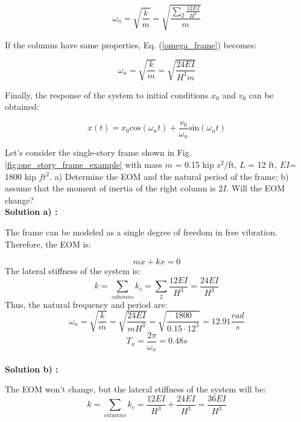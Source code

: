 \documentclass[12pt,letter]{article}
\begin{document}
\begin{equation} \label{omega_frame}
\omega_n = \sqrt{\frac{k}{m}} = \sqrt{\frac{\sum_{2}^{} \frac{12EI} {H^3}}{m}}
\end{equation}

If the columns have same properties, Eq. (\ref{omega_frame}) becomes:

\begin{equation}
\omega_n = \sqrt{\frac{k}{m}} = \sqrt{\frac{24EI}{H^3m}}
\end{equation}


Finally, the response of the system to initial conditions $x_0$ and ${v_0}$ can be obtained:

\begin{equation}
x(t) = x_0\text{cos}(\omega_n t) + \frac{v_0}{\omega_n}\text{sin}(\omega_n t)
\end{equation}	



\begin{example}
	
Let's consider the single-story frame shown in Fig. \ref{fig:one_story_frame_example} with mass $m$ = 0.15 kip $s^2$/ft, $L$ = 12 ft, $EI$= 1800 kip $ft^2$. a) Determine the EOM and the natural period of the frame; b) assume that the moment of inertia of the right column is $2I$. Will the EOM change? \\

\noindent \textbf{Solution a) :} 

The frame can be modeled as a single degree of freedom in free vibration. Therefore, the EOM is:

\begin{equation}
	m \ddot{x} + k x = 0
\end{equation}
The lateral stiffness of the system is:
\begin{equation}
k = \sum_{columns}^{} k_c = \sum_{2}^{} \frac{12EI} {H^3} = \frac{24 EI}{H^3}
\end{equation}
Thus, the natural frequency and period are:
\begin{equation}
\omega_n = \sqrt{\frac{k}{m}} = \sqrt{\frac{24 EI}{m H^3}} = \sqrt{\frac{1800}{0.15 \cdot 12^3}} = 12.91 \frac{rad}{s}
\end{equation}
\begin{equation}
T_n =\frac{2 \pi}{\omega_n} = 0.48 s
\end{equation} \\

\noindent \textbf{Solution b) :} 

The EOM won't change, but the lateral stiffness of the system will be: 
\begin{equation}
k = \sum_{columns}^{} k_c = \frac{12EI} {H^3} + \frac{24EI} {H^3} = \frac{36 EI}{H^3}
\end{equation}

\end{example}
\end{document}
